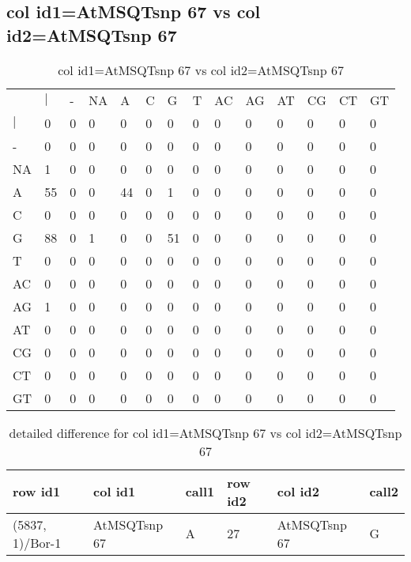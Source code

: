 \subsection{col id1=AtMSQTsnp 67 vs col id2=AtMSQTsnp 67}
\begin{center}
\begin{longtable}{|l|l|l|l|l|l|l|l|l|l|l|l|l|l|}
\caption{col id1=AtMSQTsnp 67 vs col id2=AtMSQTsnp 67} \label{table_dm758}\\
\hline
\\
\hline
&$|$&-&NA&A&C&G&T&AC&AG&AT&CG&CT&GT\\
$|$&0&0&0&0&0&0&0&0&0&0&0&0&0\\
-&0&0&0&0&0&0&0&0&0&0&0&0&0\\
NA&1&0&0&0&0&0&0&0&0&0&0&0&0\\
A&55&0&0&44&0&1&0&0&0&0&0&0&0\\
C&0&0&0&0&0&0&0&0&0&0&0&0&0\\
G&88&0&1&0&0&51&0&0&0&0&0&0&0\\
T&0&0&0&0&0&0&0&0&0&0&0&0&0\\
AC&0&0&0&0&0&0&0&0&0&0&0&0&0\\
AG&1&0&0&0&0&0&0&0&0&0&0&0&0\\
AT&0&0&0&0&0&0&0&0&0&0&0&0&0\\
CG&0&0&0&0&0&0&0&0&0&0&0&0&0\\
CT&0&0&0&0&0&0&0&0&0&0&0&0&0\\
GT&0&0&0&0&0&0&0&0&0&0&0&0&0\\
\hline
\end{longtable}
\end{center}

\begin{center}
\begin{longtable}{|l|l|l|l|l|l|}
\caption{detailed difference for col id1=AtMSQTsnp 67 vs col id2=AtMSQTsnp 67} \label{table_dm759}\\
\hline
row id1&col id1&call1&row id2&col id2&call2\\
\hline
(5837, 1)/Bor-1&AtMSQTsnp 67&A&27&AtMSQTsnp 67&G\\
\hline
\end{longtable}
\end{center}

